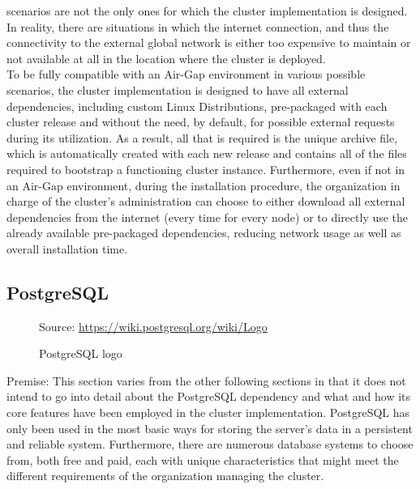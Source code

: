 scenarios are not the only ones for which the cluster implementation is designed.
In reality, there are situations in which the internet connection, and thus the
connectivity to the external global network is either too expensive to maintain
or not available at all in the location where the cluster is deployed. \\ %
To be fully compatible with an Air-Gap environment in various possible scenarios,
the cluster implementation is designed to have all external dependencies,
including custom Linux Distributions, pre-packaged with each cluster release and
without the need, by default, for possible external requests during its utilization.
As a result, all that is required is the unique archive file, which is
automatically created with each new release and contains all of the files
required to bootstrap a functioning cluster instance. Furthermore, even if not
in an Air-Gap environment, during the installation procedure, the organization
in charge of the cluster's administration can choose to either download all
external dependencies from the internet (every time for every node) or to
directly use the already available pre-packaged dependencies, reducing network usage
as well as overall installation time.

\subsection{PostgreSQL}
\label{subsec:implementation_dependencies_postgresql}

\begin{figure} %
  \centering
  \def\stackalignment{l} %
  {\scriptsize \parbox[t]{\linewidth}{ Source: \url{https://wiki.postgresql.org/wiki/Logo}} }
  \caption{PostgreSQL logo}
\end{figure}

Premise: This section varies from the other following sections in that it does
not intend to go into detail about the PostgreSQL dependency and what and how
its core features have been employed in the cluster implementation. PostgreSQL has
only been used in the most basic ways for storing the server's data in a persistent
and reliable system. Furthermore, there are numerous database systems to choose from,
both free and paid, each with unique characteristics that might meet the different
requirements of the organization managing the cluster. \\ %

